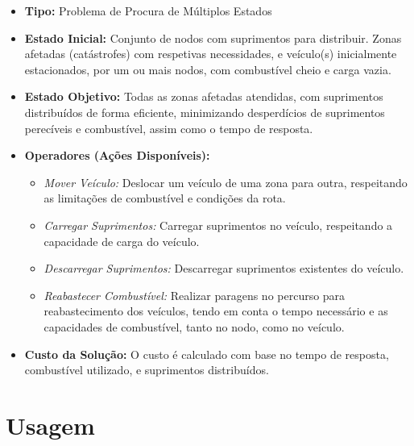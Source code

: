 \documentclass[a4paper,12pt]{scrreprt}
\begin{document}
\begin{itemize}
    \item\textbf{Tipo:} Problema de Procura de Múltiplos Estados
    \item\textbf{Estado Inicial:}  Conjunto de nodos com suprimentos para distribuir.
    Zonas afetadas (catástrofes) com respetivas necessidades, e veículo(s) inicialmente estacionados, por um ou mais nodos, com combustível cheio e
    carga vazia.
    \item\textbf{Estado Objetivo:} Todas as zonas afetadas atendidas, com suprimentos distribuídos de
    forma eficiente, minimizando desperdícios de suprimentos perecíveis e combustível, assim como o tempo de resposta.
        \item\textbf{Operadores (Ações Disponíveis):} 
        \begin{itemize}
                \item\textit{Mover Veículo:} Deslocar um veículo de uma zona para outra, respeitando as limitações de combustível e condições da rota.
                \item \textit{Carregar Suprimentos:} Carregar suprimentos no veículo, respeitando a capacidade de carga do veículo.
                \item\textit{Descarregar Suprimentos:} Descarregar suprimentos existentes do veículo.
                \item\textit{Reabastecer Combustível:} Realizar paragens no percurso para reabastecimento dos veículos, tendo em conta o tempo
                necessário e as capacidades de combustível, tanto no nodo, como no veículo. 
        \end{itemize}
    \item\textbf{Custo da Solução:} O custo é calculado com base no tempo de resposta, combustível utilizado, e suprimentos distribuídos.
    \end{itemize}



\chapter{Usagem}
\end{document}
